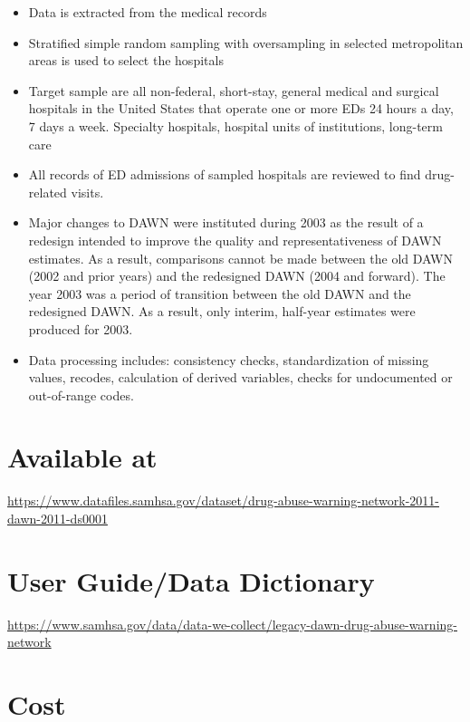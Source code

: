 \documentclass[
]{book}
\providecommand{\tightlist}{%
  \setlength{\itemsep}{0pt}\setlength{\parskip}{0pt}}
\begin{document}
\begin{itemize}
\tightlist
\item
  Data is extracted from the medical records
\item
  Stratified simple random sampling with oversampling in selected metropolitan areas is used to select the hospitals
\item
  Target sample are all non-federal, short-stay, general medical and surgical hospitals in the United States that operate one or more EDs 24 hours a day, 7 days a week. Specialty hospitals, hospital units of institutions, long-term care
\item
  All records of ED admissions of sampled hospitals are reviewed to find drug-related visits.
\item
  Major changes to DAWN were instituted during 2003 as the result of a redesign intended to improve the quality and representativeness of DAWN estimates. As a result, comparisons cannot be made between the old DAWN (2002 and prior years) and the redesigned DAWN (2004 and forward). The year 2003 was a period of transition between the old DAWN and the redesigned DAWN. As a result, only interim, half-year estimates were produced for 2003.
\item
  Data processing includes: consistency checks, standardization of missing values, recodes, calculation of derived variables, checks for undocumented or out-of-range codes.
\end{itemize}

\hypertarget{available-at-24}{%
\section{Available at}\label{available-at-24}}

\url{https://www.datafiles.samhsa.gov/dataset/drug-abuse-warning-network-2011-dawn-2011-ds0001}

\hypertarget{user-guidedata-dictionary-24}{%
\section{User Guide/Data Dictionary}\label{user-guidedata-dictionary-24}}

\url{https://www.samhsa.gov/data/data-we-collect/legacy-dawn-drug-abuse-warning-network}

\hypertarget{cost-24}{%
\section{Cost}\label{cost-24}}
\end{document}
